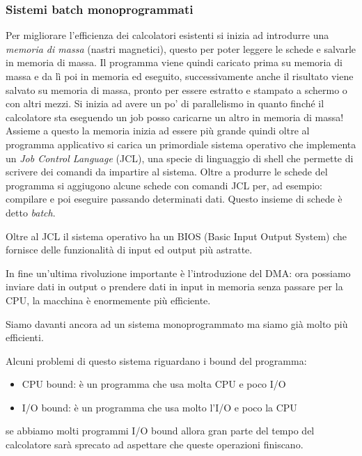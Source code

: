 \subsubsection{Sistemi batch monoprogrammati}
Per migliorare l'efficienza dei calcolatori esistenti si inizia ad introdurre una \emph{memoria di massa} (nastri magnetici), questo per poter leggere le schede e salvarle in memoria di massa.
Il programma viene quindi caricato prima su memoria di massa e da lì poi in memoria ed eseguito, successivamente anche il risultato viene salvato su memoria di massa, pronto per essere estratto e stampato a schermo o con altri mezzi.
Si inizia ad avere un po' di parallelismo in quanto finché il calcolatore sta eseguendo un job posso caricarne un altro in memoria di massa!
Assieme a questo la memoria inizia ad essere più grande quindi oltre al programma applicativo si carica un primordiale sistema operativo che implementa un \emph{Job Control Language} (JCL), una specie di linguaggio di shell che permette di scrivere dei comandi da impartire al sistema.
Oltre a produrre le schede del programma si aggiugono alcune schede con comandi JCL per, ad esempio: compilare e poi eseguire passando determinati dati. Questo insieme di schede è detto \emph{batch}.

Oltre al JCL il sistema operativo ha un BIOS (Basic Input Output System) che fornisce delle funzionalità di input ed output più astratte.

In fine un'ultima rivoluzione importante è l'introduzione del DMA: ora possiamo inviare dati in output o prendere dati in input in memoria senza passare per la CPU, la macchina è enormemente più efficiente.

Siamo davanti ancora ad un sistema monoprogrammato ma siamo già molto più efficienti.

Alcuni problemi di questo sistema riguardano i bound del programma:
\begin{itemize}
    \item CPU bound: è un programma che usa molta CPU e poco I/O
    \item I/O bound: è un programma che usa molto l'I/O e poco la CPU
\end{itemize}
se abbiamo molti programmi I/O bound allora gran parte del tempo del calcolatore sarà sprecato ad aspettare che queste operazioni finiscano.

